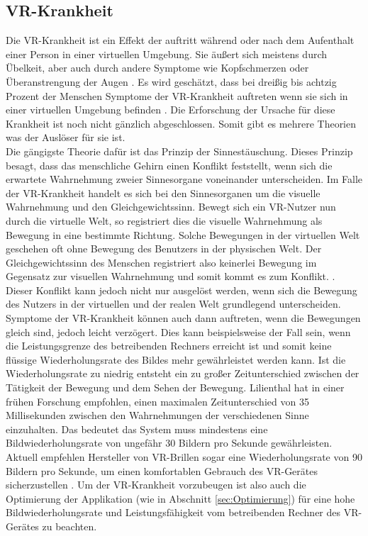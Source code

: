 \subsection{VR-Krankheit}
\label{sec:VRSickness}
Die VR-Krankheit ist ein Effekt der auftritt während oder nach dem Aufenthalt einer Person in einer virtuellen Umgebung. Sie äußert sich meistens durch Übelkeit, aber auch durch andere Symptome wie Kopfschmerzen oder Überanstrengung der Augen \cite{bib:VRSicknessLaviola}. Es wird geschätzt, dass bei dreißig bis achtzig Prozent der Menschen Symptome der VR-Krankheit auftreten wenn sie sich in einer virtuellen Umgebung befinden \cite{bib:VRSicknessRebenitsch}. Die Erforschung der Ursache für diese Krankheit ist noch nicht gänzlich abgeschlossen. Somit gibt es mehrere Theorien was der Auslöser für sie ist.\\

Die gängigste Theorie dafür ist das Prinzip der Sinnestäuschung. Dieses Prinzip besagt, dass das menschliche Gehirn einen Konflikt feststellt, wenn sich die erwartete Wahrnehmung zweier Sinnesorgane voneinander unterscheiden. Im Falle der VR-Krankheit handelt es sich bei den Sinnesorganen um die visuelle Wahrnehmung und den Gleichgewichtssinn. Bewegt sich ein VR-Nutzer nun durch die virtuelle Welt, so registriert dies die visuelle Wahrnehmung als Bewegung in eine bestimmte Richtung. Solche Bewegungen in der virtuellen Welt geschehen oft ohne Bewegung des Benutzers in der physischen Welt. Der Gleichgewichtssinn des Menschen registriert also keinerlei Bewegung im Gegensatz zur visuellen Wahrnehmung und somit kommt es zum Konflikt. \cite{bib:VRSicknessKolanski}. \\

Dieser Konflikt kann jedoch nicht nur ausgelöst werden, wenn sich die Bewegung des Nutzers in der virtuellen und der realen Welt grundlegend unterscheiden. Symptome der VR-Krankheit können auch dann auftreten, wenn die Bewegungen gleich sind, jedoch leicht verzögert. Dies kann beispielsweise der Fall sein, wenn die Leistungsgrenze des betreibenden Rechners erreicht ist und somit keine flüssige Wiederholungsrate des Bildes mehr gewährleistet werden kann. Ist die Wiederholungsrate zu niedrig entsteht ein zu großer Zeitunterschied zwischen der Tätigkeit der Bewegung und dem Sehen der Bewegung. Lilienthal hat in einer frühen Forschung empfohlen, einen maximalen Zeitunterschied von 35 Millisekunden zwischen den Wahrnehmungen der verschiedenen Sinne einzuhalten\cite{bib:VRSicknessPausch}. Das bedeutet das System muss mindestens eine Bildwiederholungsrate von ungefähr 30 Bildern pro Sekunde gewährleisten.  Aktuell empfehlen Hersteller von VR-Brillen sogar eine Wiederholungsrate von 90 Bildern pro Sekunde, um einen komfortablen Gebrauch des VR-Gerätes sicherzustellen \cite{bib:90FpsMin}. Um der VR-Krankheit vorzubeugen ist also auch die Optimierung der Applikation (wie in Abschnitt \ref{sec:Optimierung}) für eine hohe Bildwiederholungsrate und Leistungsfähigkeit vom betreibenden Rechner des VR-Gerätes zu beachten.\\

